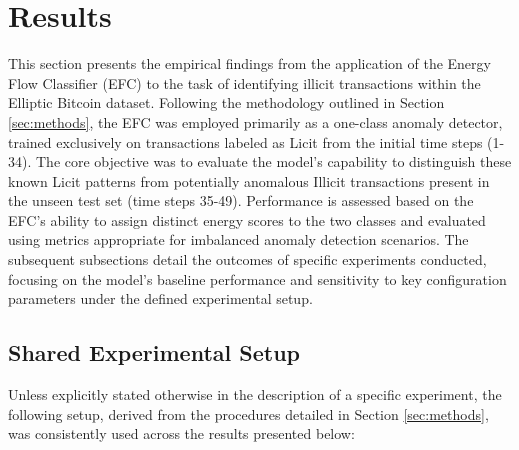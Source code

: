 \documentclass[12pt]{article}
\begin{document}
\section{Results} \label{sec:results}

This section presents the empirical findings from the application of the Energy Flow Classifier (EFC) to the task of
identifying illicit transactions within the Elliptic Bitcoin dataset. Following the methodology outlined in Section
\ref{sec:methods}, the EFC was employed primarily as a one-class anomaly detector, trained exclusively on transactions
labeled as Licit from the initial time steps (1-34). The core objective was to evaluate the model's capability to distinguish
these known Licit patterns from potentially anomalous Illicit transactions present in the unseen test set (time steps 35-49).
Performance is assessed based on the EFC's ability to assign distinct energy scores to the two classes and evaluated using
metrics appropriate for imbalanced anomaly detection scenarios. The subsequent subsections detail the outcomes of specific
experiments conducted, focusing on the model's baseline performance and sensitivity to key configuration parameters under
the defined experimental setup.

\subsection{Shared Experimental Setup} \label{subsec:shared_setup}

Unless explicitly stated otherwise in the description of a specific experiment, the following setup, derived from the procedures
detailed in Section \ref{sec:methods}, was consistently used across the results presented below:
\end{document}
